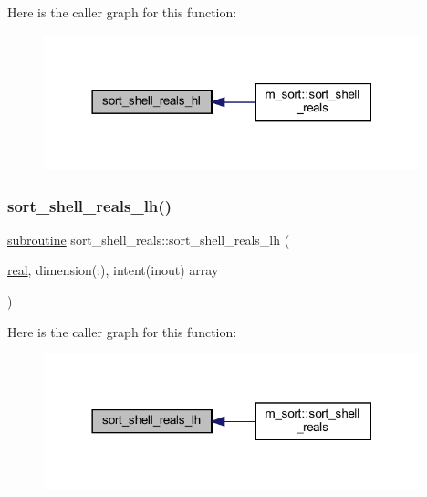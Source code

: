 Here is the caller graph for this function\+:
\nopagebreak
\begin{figure}[H]
\begin{center}
\leavevmode
\includegraphics[width=309pt]{M__sort_8f90_a63fb4486f21d271616dd3d9ae7d1d90f_icgraph}
\end{center}
\end{figure}
\mbox{\label{M__sort_8f90_ab8554ae60b996aa5dea2c52607efa551}} 
\subsubsection{\texorpdfstring{sort\+\_\+shell\+\_\+reals\+\_\+lh()}{sort\_shell\_reals\_lh()}}
{\footnotesize\ttfamily \hyperlink{M__stopwatch_83_8txt_acfbcff50169d691ff02d4a123ed70482}{subroutine} sort\+\_\+shell\+\_\+reals\+::sort\+\_\+shell\+\_\+reals\+\_\+lh (\begin{DoxyParamCaption}\item[{\hyperlink{read__watch_83_8txt_abdb62bde002f38ef75f810d3a905a823}{real}, dimension(\+:), intent(inout)}]{array }\end{DoxyParamCaption})\hspace{0.3cm}{\ttfamily [private]}}

Here is the caller graph for this function\+:
\nopagebreak
\begin{figure}[H]
\begin{center}
\leavevmode
\includegraphics[width=309pt]{M__sort_8f90_ab8554ae60b996aa5dea2c52607efa551_icgraph}
\end{center}
\end{figure}
\mbox{\label{M__sort_8f90_a16bd54666fe44ae00984394bdeb454b1}} 
